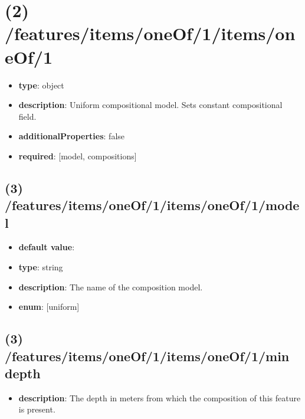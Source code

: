 \section{(2) /features/items/oneOf/1/items/oneOf/1}
\begin{itemize}[leftmargin=2em]\item {\bf type}: object
\item {\bf description}: Uniform compositional model. Sets constant compositional field.
\item {\bf additionalProperties}: false
\item {\bf required}: [model, compositions]\end{itemize}
\subsection{(3) /features/items/oneOf/1/items/oneOf/1/model}
\begin{itemize}[leftmargin=3em]\item {\bf default value}: 
\item {\bf type}: string
\item {\bf description}: The name of the composition model.
\item {\bf enum}: [uniform]\end{itemize}\subsection{(3) /features/items/oneOf/1/items/oneOf/1/min depth}
\begin{itemize}[leftmargin=3em]\item {\bf description}: The depth in meters from which the composition of this feature is present.
\end{itemize}
